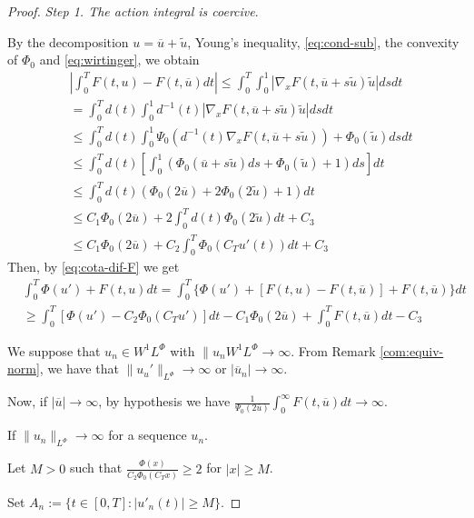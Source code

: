 \documentclass[twoside]{article}
\theoremstyle{remark}
\newcommand{\orlnor}{\|_{L^{\Phi}}}
\newcommand{\lphi}{L^{\Phi}}
\newcommand{\wphi}{W^{1}\lphi}
\renewcommand{\leq}{\leqslant}
\renewcommand{\geq}{\geqslant}
\begin{document}
\begin{proof} \emph{Step 1. The action integral is coercive}.
  
  
By the decomposition $u=\overline{u}+\tilde{u}$,   Young's inequality, \eqref{eq:cond-sub}, the convexity of $\Phi_0$
and \eqref{eq:wirtinger},
we obtain
\begin{equation}\label{eq:cota-dif-F}
\begin{split}
&\left|\int_0^T F(t,u)-F(t,\overline{u})dt\right|
\leq \int_0^T \int_0^1 |\nabla_x F(t,\overline{u}+s\tilde{u})\tilde{u}|dsdt
\\
&=\int_0^T d(t) \int_0^1 d^{-1}(t) |\nabla_x F(t,\overline{u}+s\tilde{u})\tilde{u}|dsdt
\\
&\leq
\int_0^T d(t) \int_0^1 \Psi_0(d^{-1}(t)\nabla_xF(t,\overline{u}+s\tilde{u}))+\Phi_0(\tilde{u})dsdt
\\
&\leq
\int_0^T d(t)\left[\int_0^1 \left(\Phi_0(\overline{u}+s\tilde{u})ds+\Phi_0(\tilde{u})+1 \right)ds\right]dt
\\
&\leq
\int_0^T d(t) (\Phi_0(2\overline{u})+2 \Phi_0(2\tilde{u})+1)dt
\\
&\leq C_1 \Phi_0(2\overline{u})+2\int_0^T d(t)\Phi_0(2 \tilde{u})dt+C_3
\\
&
\leq C_1 \Phi_0(2\overline {u}) +C_2 \int_0^T \Phi_0 (C_T u'(t))dt+C_3
\end{split}
\end{equation}
Then, by \eqref{eq:cota-dif-F} we get
\begin{equation}
\begin{split}
&\int_0^T  \Phi(u')+F(t,u)dt=
\int_0^T \{\Phi(u')+[F(t,u)-F(t,\overline{u})]+F(t,\overline{u})\}dt
\\
&\geq
\int_0^T [\Phi(u')-C_2 \Phi_0(C_T u')]dt-C_1\Phi_0(2 \overline{u})+\int_0^T F(t,\overline{u})dt-C_3
\end{split}
\end{equation}

We suppose that $u_n\in\wphi$ with $\|u_n\wphi\to\infty$. From Remark \ref{com:equiv-norm}, we have that $\|u_u'\orlnor \to \infty$ or $|\overline{u}_n|\to \infty$.

Now, if $|\overline{u}|\to \infty$, by hypothesis we have
$\frac{1}{\Psi_0(2 \overline{u})}\int_0^\infty F(t,\overline{u})dt\to \infty$.

If $\|u_n\orlnor \to \infty$ for a sequence $u_n$.

Let $M>0$ such that $\frac{\Phi(x)}{C_2\Phi_0(C_Tx)}\geq 2$ for $|x|\geq M$.

Set $A_n:=\{t\in [0,T]:|u'_n(t)|\geq M\}$.


\end{proof}
\end{document}
